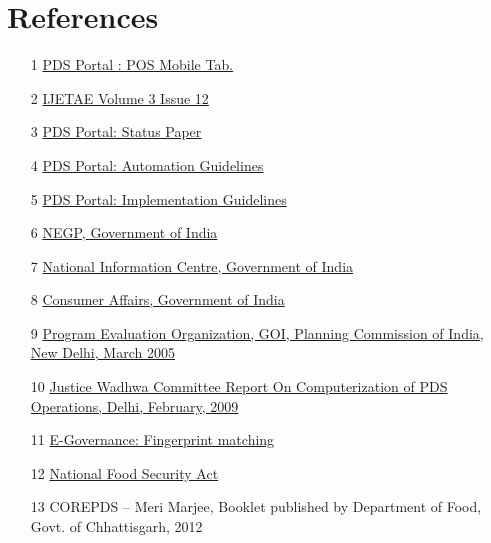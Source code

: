 \documentclass[a4paper,12pt]{extarticle}
\begin{document}
\section{References}
\begin{enumerate}
\item [1]  \href{http://pdsportal.nic.in/files/POS-MobileTab%20Specifications-2015-05-12-Approved.pdf}{PDS Portal : POS Mobile Tab.}
\item [2] \href{http://www.ijetae.com/files/Volume3Issue12/IJETAE_1213_69.pdf}{IJETAE Volume 3 Issue 12}
\item [3]\href{http://www.pdsportal.nic.in/Files/Final-Status_Paper.pdf}{PDS Portal: Status Paper}
\item [4]\href{http://www.pdsportal.nic.in/Files/Letter%20to%20StatesUTs%20and%20FPS%20automation%20guidelines%20dtd%2011Nov14.pdf}{PDS Portal: Automation Guidelines}
\item [5]\href{http://www.pdsportal.nic.in/Files/Implementation%20Guidelines%20Finalised.pdf}{PDS Portal: Implementation Guidelines}
\item [6]\href{https://negp.gov.in/pdfs/c6.pdf}{NEGP, Government of India}
\item [7]\href{http://www.nic.in/about-us}{National Information Centre, Government of India}
\item [8]\href{http://fcamin.nic.in/}{Consumer Affairs, Government of India}
\item [9]\href{http://planningcommission.nic.in/reports/peoreport/peo/peo_tpds.pdf} {Program Evaluation Organization, GOI, Planning Commission of India, New Delhi, March 2005  } 
\item [10]\href{http://pdscvc.nic.in/report%20on%20computersisation%20of%20PDS.htm} {Justice Wadhwa Committee Report On Computerization of PDS Operations, Delhi, February, 2009}
\item [11]\href{http://egovernance.gov.in/standardsandFramework/biometric-standards/fingerprint_image_data_standard_for_printing_Nov_10.pdf} {E-Governance: Fingerprint matching}
\item [12]\href{http://dfpd.nic.in/nfsa-act.htm}{National Food Security Act}
\item [13]COREPDS – Meri Marjee, Booklet published by Department of Food, Govt. of Chhattisgarh, 2012
\end{enumerate}
\end{document}

